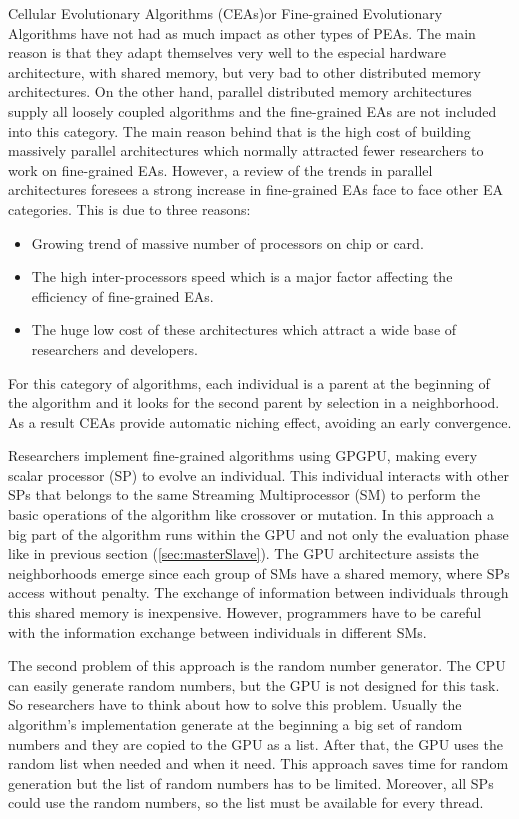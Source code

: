 \documentclass[review]{elsarticle}
\begin{document}
Cellular Evolutionary Algorithms (CEAs)or Fine-grained Evolutionary Algorithms have not had as much impact as other types of PEAs. The main reason is that they adapt themselves very well to the especial hardware architecture, with shared memory, but very bad to other distributed memory architectures. On the other hand, parallel distributed memory architectures supply all loosely coupled algorithms and the fine-grained EAs are not included into this category. The main reason behind that is the high cost of building massively parallel architectures which normally attracted fewer researchers to work on fine-grained EAs. However, a review of the trends in parallel architectures foresees a strong increase in fine-grained EAs face to face other EA categories. This is due to three reasons: 

\begin{itemize}
\item Growing trend of massive number of processors on chip or card. 
\item The high inter-processors speed which is a major factor affecting the efficiency of fine-grained EAs. 
\item The huge low cost of these architectures which attract a wide base of researchers and developers. 
\end{itemize}

For this category of algorithms, each individual is a parent at the beginning of the algorithm and it looks for the second parent by selection in a neighborhood. As a result CEAs provide automatic niching effect, avoiding an early convergence. 

Researchers implement fine-grained algorithms using GPGPU, making every scalar processor (SP) to evolve an individual. This individual interacts with other SPs that belongs to the same Streaming Multiprocessor (SM) to perform the basic operations of the algorithm like crossover or mutation. In this approach a big part of the algorithm runs within the GPU and not only the evaluation phase like in previous section (\ref{sec:masterSlave}). The GPU architecture assists the neighborhoods emerge since each group of SMs have a shared memory, where SPs access without penalty. The exchange of information between individuals through this shared memory is inexpensive. However, programmers have to be careful with the information exchange between individuals in different SMs. 

The second problem of this approach is the random number generator. The CPU can easily generate random numbers, but the GPU is not designed for this task. So researchers have to think about how to solve this problem. Usually the algorithm's implementation generate at the beginning a big set of random numbers and they are copied to the GPU as a list. After that, the GPU uses the random list when needed and when it need. This approach saves time for random generation but the list of random numbers has to be limited. Moreover, all SPs could use the random numbers, so the list must be available for every thread. 
\end{document}
